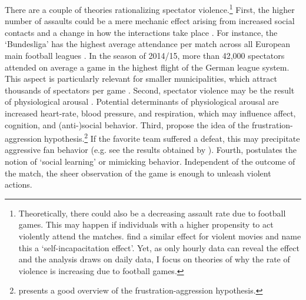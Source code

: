 There are a couple of theories rationalizing spectator violence.\footnote{Theoretically, there could also be a decreasing assault rate due to football games. This may happen if individuals with a higher propensity to act violently attend the matches. \cite{dahl2009movie} find a similar effect for violent movies and name this a `self-incapacitation effect'. Yet, as only hourly data can reveal the effect and the analysis draws on daily data, I focus on theories of why the rate of violence is increasing due to football games.} First, the higher number of assaults could be a mere mechanic effect arising from increased social contacts and a change in how the interactions take place \citep{montolio2019measuring}. For instance, the `Bundesliga' has the highest average attendance per match across all European main football leagues \citep{wicker2017effect}. In the season of 2014/15, more than 42,000 spectators attended on average a game in the highest flight of the German league system. This aspect is particularly relevant for smaller municipalities, which attract thousands of spectators per game \citep{lindo2018college}. Second, spectator violence may be the result of physiological arousal \citep{branscombe1992role}. Potential determinants of physiological arousal are increased heart-rate, blood pressure, and respiration, which may influence affect, cognition, and (anti-)social behavior. Third, \cite{dollard1939frustration} propose the idea of the frustration-aggression hypothesis.\footnote{\cite{berkowitz1989frustration} presents a good overview of the frustration-aggression hypothesis.} If the favorite team suffered a defeat, this may precipitate aggressive fan behavior (e.g. see the results obtained by \cite{card2011family}). Fourth, \cite{bandura1973aggression, bandura2007social} postulates the notion of `social learning' or mimicking behavior. Independent of the outcome of the match, the sheer observation of the game is enough to unleash violent actions.



